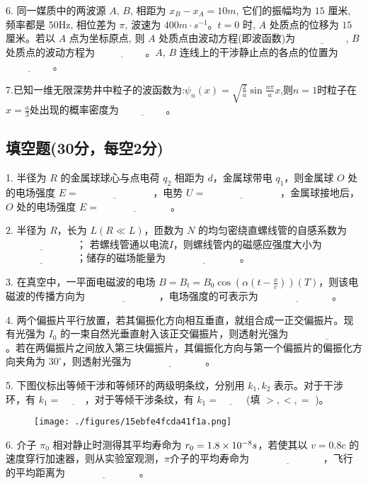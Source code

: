 6. 同一媒质中的两波源 $A$, $B$, 相距为 $x_B - x_A = 10m$, 它们的振幅均为 $15$ 厘米, 频率都是 $50$Hz, 相位差为 $\pi$, 波速为 $400m\cdot s^{-1}$。$t = 0$ 时, $A$ 处质点的位移为 $15$ 厘米。若以 $A$ 点为坐标原点, 则 $A$ 处质点由波动方程(即波函数)为 $\underline{\hspace{2cm}}$, $B$ 处质点的波动方程为 $\underline{\hspace{2cm}}$。$A$, $B$ 连线上的干涉静止点的各点的位置为 $\underline{\hspace{2cm}}$。

7.已知一维无限深势井中粒子的波函数为:$\psi_n(x)=\sqrt{\frac{2}{a}}\sin \frac{n \pi }{a}x$,则$n=1$时粒子在$x=\frac{a}{3}$处出现的概率密度为$\underline{\hspace{2cm}}$。

\subsection{填空题(30分，每空2分)}
1. 半径为 $R$ 的金属球球心与点电荷 $q_2$ 相距为 $d$，金属球带电 $q_1$，则金属球 $O$ 处的电场强度 $E= \underline{\hspace{3cm}}$ ，电势 $U= \underline{\hspace{3cm}}$ ，金属球接地后，$O$ 处的电场强度 $E= \underline{\hspace{3cm}}$。

  2. 半径为 $R$，长为 $L (R \ll L)$，匝数为 $N$ 的均匀密绕直螺线管的自感系数为 $\underline{\hspace{3cm}}$； 若螺线管通以电流$I$，则螺线管内的磁感应强度大小为 $\underline{\hspace{3cm}}$；储存的磁场能量为 $\underline{\hspace{3cm}}$。

  3. 在真空中，一平面电磁波的电场 $B=B_t=B_0 \cos(\alpha (t - \frac{x}{c})) (T)$，则该电磁波的传播方向为 $\underline{\hspace{3cm}}$，电场强度的可表示为 $\underline{\hspace{3cm}}$。

  4. 两个偏振片平行放置，若其偏振化方向相互垂直，就组合成一正交偏振片。现有光强为 $I_0$ 的一束自然光垂直射入该正交偏振片，则透射光强为 $\underline{\hspace{3cm}}$。若在两偏振片之间放入第三块偏振片，其偏振化方向与第一个偏振片的偏振化方向夹角为 $30^\circ$，则透射光强为 $\underline{\hspace{3cm}}$。

  5. 下图仪标出等倾干涉和等倾环的两级明条纹，分别用 $k_1, k_2$ 表示。对于干涉环，有 $k_1 = \underline{\hspace{1cm}}$，对于等倾干涉条纹，有 $k_1 = \underline{\hspace{1cm}}$ (填 $>, <, =$ )。
\begin{figure}[ht]
\centering
\texttt{[image: ./figures/15ebfe4fcda41f1a.png]}
\caption{} \label{fig_NJU07_3}
\end{figure}
6. 介子 $\pi_0$ 相对静止时测得其平均寿命为 $r_0=1.8 \times 10^{-8} \\ s$，若使其以 $v = 0.8c$ 的速度穿行加速器，则从实验室观测，$\pi$介子的平均寿命为 $\underline{\hspace{3cm}}$，飞行的平均距离为 $\underline{\hspace{3cm}}$。
